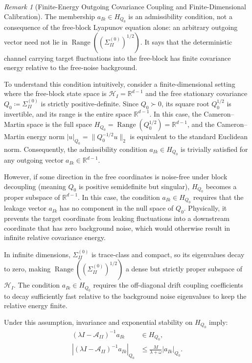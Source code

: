 \documentclass[11pt]{amsart}
\theoremstyle{plain}
\theoremstyle{definition}
\theoremstyle{remark}
\newtheorem{remark}[theorem]{Remark}
\begin{document}
    \begin{remark}[Finite-Energy Outgoing Covariance Coupling and Finite-Dimensional Calibration]
        \label{rem:cm_information_flow}
        The membership $a_{Ik}\in H_{Q_0}$ is an admissibility condition,
        not a consequence of the free-block Lyapunov equation alone: an arbitrary
        outgoing vector need not lie in
        $\operatorname{Range}((\Sigma_{II}^{(0)})^{1/2})$.  It says that the
        deterministic channel carrying target fluctuations into the free-block has
        finite covariance energy relative to the free-noise background.
  
        To understand this condition intuitively, consider a finite-dimensional setting where the free-block state space is $\mathcal{H}_I = \mathbb{R}^{d-1}$ and the free stationary covariance $Q_0 \coloneqq \Sigma_{II}^{(0)}$ is strictly positive-definite. Since $Q_0 \succ 0$, its square root $Q_0^{1/2}$ is invertible, and its range is the entire space $\mathbb{R}^{d-1}$. In this case, the Cameron--Martin space is the full space $H_{Q_0} = \operatorname{Range}(Q_0^{1/2}) = \mathbb{R}^{d-1}$, and the Cameron--Martin energy norm $|u|_{Q_0} = \|Q_0^{-1/2} u\|_2$ is equivalent to the standard Euclidean norm. Consequently, the admissibility condition $a_{Ik} \in H_{Q_0}$ is trivially satisfied for any outgoing vector $a_{Ik} \in \mathbb{R}^{d-1}$.
  
        However, if some direction in the free coordinates is noise-free under block decoupling (meaning $Q_0$ is positive semidefinite but singular), $H_{Q_0}$ becomes a proper subspace of $\mathbb{R}^{d-1}$. In this case, the condition $a_{Ik} \in H_{Q_0}$ requires that the leakage vector $a_{Ik}$ has no component in the null space of $Q_0$. Physically, it prevents the target coordinate from leaking fluctuations into a downstream coordinate that has zero background noise, which would otherwise result in infinite relative covariance energy.
  
        In infinite dimensions, $\Sigma_{II}^{(0)}$ is trace-class and compact, so its eigenvalues decay to zero, making $\operatorname{Range}((\Sigma_{II}^{(0)})^{1/2})$ a dense but strictly proper subspace of $\mathcal{H}_I$. The condition $a_{Ik} \in H_{Q_0}$ requires the off-diagonal drift coupling coefficients to decay sufficiently fast relative to the background noise eigenvalues to keep the relative energy finite.
  
        Under this assumption, invariance and exponential stability on $H_{Q_0}$ imply:
        \begin{equation}
            \begin{aligned}
                (\lambda I-\mathcal{A}_{II})^{-1}a_{Ik}
                &\in H_{Q_0},\\
                |(\lambda I-\mathcal{A}_{II})^{-1}a_{Ik}|_{Q_0}
                &\le \frac{M}{\lambda+\omega}|a_{Ik}|_{Q_0}.
            \end{aligned}
        \end{equation}
    \end{remark}
\end{document}
